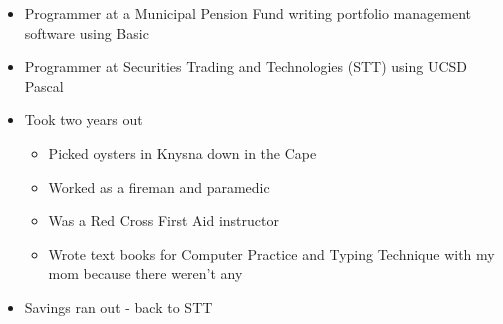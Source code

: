 \begin{frame}[t]
	\vspace{4\baselineskip}	
	\begin{itemize}
		\item Programmer at a Municipal Pension Fund writing portfolio management software using Basic
		\item Programmer at Securities Trading and Technologies (STT) using UCSD Pascal
		\item Took two years out
		\begin{itemize}
			\item Picked oysters in Knysna down in the Cape
			\item Worked as a fireman and paramedic
			\item Was a Red Cross First Aid instructor
			\item Wrote text books for Computer Practice and Typing Technique with my mom because there weren't any
		\end{itemize}
		\item Savings ran out - back to STT

	\end{itemize}
\end{frame}